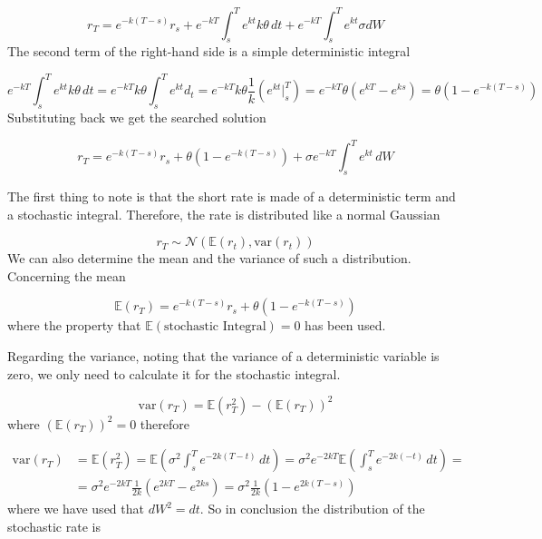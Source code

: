 \begin{equation*}
	r_T=e^{-k(T-s)}r_s+ e^{-kT}\int^T_s e^{kt}k\theta\,dt +e^{-kT}\int^T_s e^{kt}\sigma dW
\end{equation*}
The second term of the right-hand side is a simple deterministic integral

\[e^{-kT}\int^T_s e^{kt}k\theta\,dt=e^{-kT}k\theta\int^T_s e^{kt}d_t=e^{-kT}k\theta\frac{1}{k}(e^{kt}|^T_s)= e^{-kT}\theta(e^{kT}-e^{ks})=\theta\left(1-e^{-k(T-s)}\right)\]
Substituting back we get the searched solution

\begin{equation}
	r_T=e^{-k(T-s)} r_s+\theta(1-e^{-k(T-s)})+ \sigma e^{-kT}\int^T_s e^{kt}\,dW
\end{equation}

The first thing to note is that the short rate is made of a deterministic term
and a stochastic integral.
Therefore, the rate is distributed like a normal Gaussian

\[r_T \sim \mathcal{N}(\mathbb{E}(r_t), \textrm{var}(r_t))\]
We can also determine the mean and the variance of such a distribution.
Concerning the mean

\begin{equation}
	\mathbb{E}(r_T)=e^{-k(T-s)} r_s+\theta\left(1-e^{-k(T-s)}\right)
\end{equation}
where the property that \(\mathbb{E}(\textrm{stochastic~Integral}) = 0\) has been used.

Regarding the variance, noting that the variance of a deterministic
variable is zero, we only need to calculate it for the
stochastic integral. %

\begin{equation*}
	\textrm{var}(r_T)=\mathbb{E}(r^2_T)-(\mathbb{E}(r_T))^2
\end{equation*}
where \((\mathbb{E}(r_T))^2 = 0\) therefore

\begin{equation}
\begin{aligned}
\textrm{var}(r_T)&=\mathbb{E}(r^2_T)=\mathbb{E}(\sigma^2 \int^T_s e^{-2k(T-t)}\,dt)=\sigma^2 e^{-2kT} \mathbb{E}( \int^T_s e^{-2k(-t)}\,dt)=\\
&=\sigma^2 e^{-2kT} \frac {1}{2k}(e^{2kT}-e^{2ks})=\sigma^2 \frac {1}{2k}(1-e^{2k(T-s)}) 
\end{aligned}
\end{equation}
where we have used that $dW^2 = dt$.
So in conclusion the distribution of the stochastic rate is

